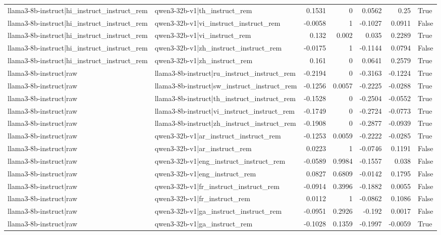 \begin{table}
\begin{tabular}{l l r r r r l}
llama3-8b-instruct|hi_instruct_instruct_rem & qwen3-32b-v1|th_instruct_rem & 0.1531 & 0 & 0.0562 & 0.25 & True \\
llama3-8b-instruct|hi_instruct_instruct_rem & qwen3-32b-v1|vi_instruct_instruct_rem & -0.0058 & 1 & -0.1027 & 0.0911 & False \\
llama3-8b-instruct|hi_instruct_instruct_rem & qwen3-32b-v1|vi_instruct_rem & 0.132 & 0.002 & 0.035 & 0.2289 & True \\
llama3-8b-instruct|hi_instruct_instruct_rem & qwen3-32b-v1|zh_instruct_instruct_rem & -0.0175 & 1 & -0.1144 & 0.0794 & False \\
llama3-8b-instruct|hi_instruct_instruct_rem & qwen3-32b-v1|zh_instruct_rem & 0.161 & 0 & 0.0641 & 0.2579 & True \\
llama3-8b-instruct|raw & llama3-8b-instruct|ru_instruct_instruct_rem & -0.2194 & 0 & -0.3163 & -0.1224 & True \\
llama3-8b-instruct|raw & llama3-8b-instruct|sw_instruct_instruct_rem & -0.1256 & 0.0057 & -0.2225 & -0.0288 & True \\
llama3-8b-instruct|raw & llama3-8b-instruct|th_instruct_instruct_rem & -0.1528 & 0 & -0.2504 & -0.0552 & True \\
llama3-8b-instruct|raw & llama3-8b-instruct|vi_instruct_instruct_rem & -0.1749 & 0 & -0.2724 & -0.0773 & True \\
llama3-8b-instruct|raw & llama3-8b-instruct|zh_instruct_instruct_rem & -0.1908 & 0 & -0.2877 & -0.0939 & True \\
llama3-8b-instruct|raw & qwen3-32b-v1|ar_instruct_instruct_rem & -0.1253 & 0.0059 & -0.2222 & -0.0285 & True \\
llama3-8b-instruct|raw & qwen3-32b-v1|ar_instruct_rem & 0.0223 & 1 & -0.0746 & 0.1191 & False \\
llama3-8b-instruct|raw & qwen3-32b-v1|eng_instruct_instruct_rem & -0.0589 & 0.9984 & -0.1557 & 0.038 & False \\
llama3-8b-instruct|raw & qwen3-32b-v1|eng_instruct_rem & 0.0827 & 0.6809 & -0.0142 & 0.1795 & False \\
llama3-8b-instruct|raw & qwen3-32b-v1|fr_instruct_instruct_rem & -0.0914 & 0.3996 & -0.1882 & 0.0055 & False \\
llama3-8b-instruct|raw & qwen3-32b-v1|fr_instruct_rem & 0.0112 & 1 & -0.0862 & 0.1086 & False \\
llama3-8b-instruct|raw & qwen3-32b-v1|ga_instruct_instruct_rem & -0.0951 & 0.2926 & -0.192 & 0.0017 & False \\
llama3-8b-instruct|raw & qwen3-32b-v1|ga_instruct_rem & -0.1028 & 0.1359 & -0.1997 & -0.0059 & True \\

\end{tabular}
\end{table}
